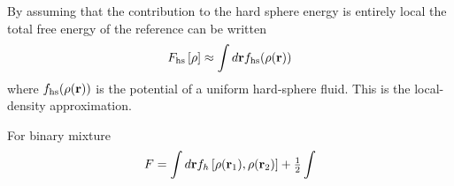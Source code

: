 By assuming that the contribution to the hard sphere energy is entirely local
the total free energy of the reference can be written
\begin{align}
  F_{\text{hs}}\left[ \rho \right] \approx \int d\textbf{r} f_{\text{hs}}(\rho(\textbf{r}))
\end{align}
where $f_{\text{hs}}(\rho(\textbf{r}))$ is the potential of a uniform  hard-sphere fluid\cite{OxtobyBook}.
This is the local-density approximation.









For binary mixture 
\begin{align}
  F = \int d\textbf{r} f_h \left[ \rho(\textbf{r}_1), \rho(\textbf{r}_2) \right] + \tfrac{1}{2} \int
\end{align}

